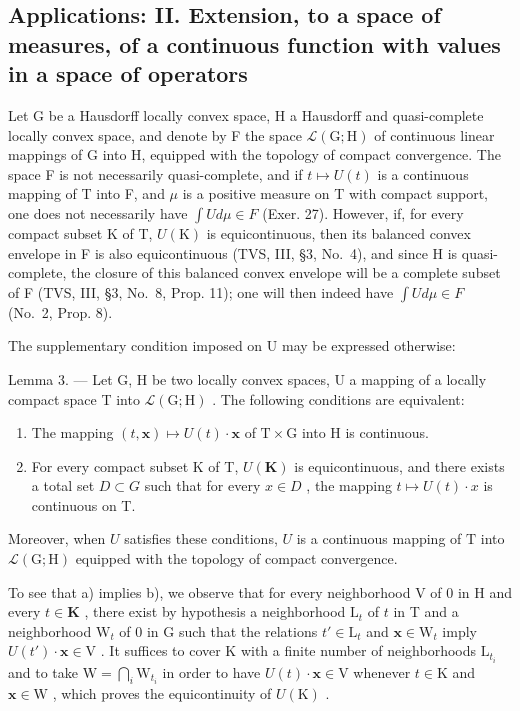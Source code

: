 \subsection{Applications: II. Extension, to a space of measures, of a continuous function with values in a space of operators}

Let G be a Hausdorff locally convex space, H a Hausdorff and quasi-complete locally convex space, and denote by F the space \(\mathcal{L}(\mathrm{G};\mathrm{H})\) of continuous linear mappings of G into H, equipped with the topology of compact convergence. The space F is not necessarily quasi-complete, and if \(t \mapsto U(t)\) is a continuous mapping of T into F, and \(\mu\) is a positive measure on T with compact support, one does not necessarily have \(\int U d\mu \in F\) (Exer. 27). However, if, for every compact subset K of T, \(U(\mathrm{K})\) is equicontinuous, then its balanced convex envelope in F is also equicontinuous (TVS, III, §3, No.~4), and since H is quasi-complete, the closure of this balanced convex envelope will be a complete subset of F (TVS, III, §3, No.~8, Prop. 11); one will then indeed have \(\int U d\mu \in F\) (No.~2, Prop. 8).

The supplementary condition imposed on U may be expressed otherwise:

Lemma 3. --- Let G, H be two locally convex spaces, U a mapping of a locally compact space T into \(\mathcal{L}(\mathrm{G};\mathrm{H})\) . The following conditions are equivalent:

\begin{enumerate}
\def\labelenumi{\alph{enumi})}
\item
  The mapping \((t,\mathbf{x})\mapsto U(t)\cdot \mathbf{x}\) of \(\mathrm{T}\times \mathrm{G}\) into H is continuous.
\item
  For every compact subset K of T, \(U(\mathbf{K})\) is equicontinuous, and there exists a total set \(D \subset G\) such that for every \(x \in D\) , the mapping \(t \mapsto U(t) \cdot x\) is continuous on T.
\end{enumerate}

Moreover, when \(U\) satisfies these conditions, \(U\) is a continuous mapping of \(\mathrm{T}\) into \(\mathcal{L}(\mathrm{G};\mathrm{H})\) equipped with the topology of compact convergence.

To see that a) implies b), we observe that for every neighborhood V of 0 in H and every \(t \in \mathbf{K}\) , there exist by hypothesis a neighborhood \(\mathrm{L}_t\) of \(t\) in T and a neighborhood \(\mathrm{W}_t\) of 0 in G such that the relations \(t' \in \mathrm{L}_t\) and \(\mathbf{x} \in \mathrm{W}_t\) imply \(U(t') \cdot \mathbf{x} \in \mathrm{V}\) . It suffices to cover K with a finite number of neighborhoods \(\mathrm{L}_{t_i}\) and to take \(\mathrm{W} = \bigcap_{i} \mathrm{W}_{t_i}\) in order to have \(U(t) \cdot \mathbf{x} \in \mathrm{V}\) whenever \(t \in \mathrm{K}\) and \(\mathbf{x} \in \mathrm{W}\) , which proves the equicontinuity of \(U(\mathrm{K})\) .

